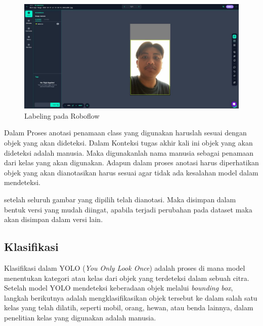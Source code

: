 \begin{figure} [H] \centering
  \includegraphics[scale=0.2]{gambar/devafoto.jpeg}
  \caption{Labeling pada Roboflow}
  \label{fig:rancangan penelitian}
\end{figure}

Dalam Proses anotasi penamaan class yang digunakan haruslah sesuai dengan objek yang akan dideteksi. Dalam Konteksi tugas akhir kali ini objek yang akan dideteksi adalah manusia. Maka digunakanlah nama manusia sebagai penamaan dari kelas yang akan digunakan. Adapun dalam proses anotasi harus diperhatikan objek yang akan dianotasikan harus sesuai agar tidak ada kesalahan model dalam mendeteksi. %

setelah seluruh gambar yang dipilih telah dianotasi. Maka disimpan dalam bentuk versi yang mudah diingat, apabila terjadi perubahan pada dataset maka akan disimpan dalam versi lain.


\subsection{Klasifikasi}
Klasifikasi dalam YOLO (\emph{You Only Look Once}) adalah proses di mana model menentukan kategori atau kelas dari objek yang terdeteksi dalam sebuah citra. Setelah model YOLO mendeteksi keberadaan objek melalui \emph{bounding box}, langkah berikutnya adalah mengklasifikasikan objek tersebut ke dalam salah satu kelas yang telah dilatih, seperti mobil, orang, hewan, atau benda lainnya, dalam penelitian kelas yang digunakan adalah manusia.


